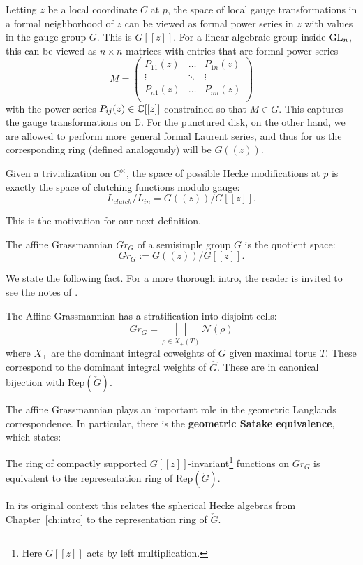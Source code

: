 	Letting $z$ be a local coordinate $C$ at $p$, the space of local gauge transformations in a formal neighborhood of $z$ can be viewed as formal power series in $z$ with values in the gauge group $G$. This is $G[[z]]$. For a linear algebraic group inside $\mathrm{GL}_n$, this can be viewed as $n\times n$ matrices with entries that are formal power series
	\[
		M = \begin{pmatrix}
			P_{11}(z) & \dots & P_{1n}(z)\\
			\vdots & \ddots & \vdots\\
			P_{n1}(z) & \dots & P_{nn}(z)\\
		\end{pmatrix}
	\]
	with the power series $P_{ij}(z) \in \mathbb{C}[[z]]$ constrained so that $M \in G$. This captures the gauge transformations on $\mathbb D$. For the punctured disk, on the other hand, we are allowed to perform more general formal Laurent series, and thus for us the corresponding ring (defined analogously) will be $G((z))$. 
	
	
	Given a trivialization on $C^\times$, the space of possible Hecke modifications at $p$ is exactly the space of clutching functions modulo gauge:
	\[
		L_{clutch} / L_{in} = G((z))/G[[z]].
	\]
	
	This is the motivation for our next definition.
	\begin{defn}
		The affine Grassmannian $Gr_G$ of a semisimple group $G$ is the quotient space:
		\[
			Gr_G := G((z))/G[[z]].
		\]
	\end{defn}
	\noindent We state the following fact. For a more thorough intro, the reader is invited to see the notes of \cite{zhu2016}.
	\begin{fact}
		The Affine Grassmannian has a stratification into disjoint cells:
		\begin{equation}
			Gr_G = \bigsqcup_{\rho \in X_+(T)} \mathcal N(\rho)
		\end{equation}
		where $X_+$ are the dominant integral coweights of $G$ given maximal torus $T$. These correspond to the dominant integral weights of $\hat G$. These are in canonical bijection with $\mathrm{Rep}(\check G)$.
	\end{fact}
	
	The affine Grassmannian plays an important role in the geometric Langlands correspondence. In particular, there is the \textbf{geometric Satake equivalence}, which states:
	\begin{theorem}
		The ring of compactly supported $G[[z]]$-invariant\footnote{Here $G[[z]]$ acts by left multiplication.} functions on $Gr_G$ is equivalent to the representation ring of $\mathrm{Rep}(\check G)$.
	\end{theorem}
	In its original context \cite{satake1963} this relates the spherical Hecke algebras from Chapter~\ref{ch:intro} to the representation ring of $\check G$.
		
